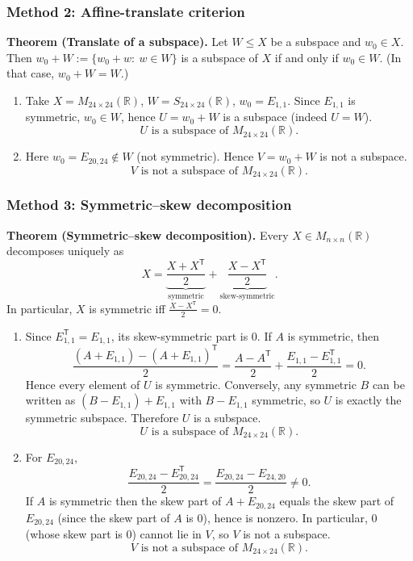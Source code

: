 \documentclass[12pt]{article}
\let\amsboxed\boxed
\renewcommand{\boxed}[1]{\amsboxed{\,#1\,}}
\begin{document}
\subsubsection{Method 2: Affine-translate criterion}
\textbf{Theorem (Translate of a subspace).}
Let $W\le X$ be a subspace and $w_0\in X$. Then $w_0+W:=\{w_0+w:\ w\in W\}$ is a subspace of $X$ if and only if $w_0\in W$.
(In that case, $w_0+W=W$.)

\begin{enumerate}[label=(\alph*)]
\item Take $X=M_{24\times 24}(\mathbb{R})$, $W=S_{24\times 24}(\mathbb{R})$, $w_0=E_{1,1}$.
Since $E_{1,1}$ is symmetric, $w_0\in W$, hence $U=w_0+W$ is a subspace (indeed $U=W$).
\[
\boxed{\,U\text{ is a subspace of }M_{24\times 24}(\mathbb{R}).\,}
\]

\item Here $w_0=E_{20,24}\notin W$ (not symmetric). Hence $V=w_0+W$ is not a subspace.
\[
\boxed{\,V\text{ is not a subspace of }M_{24\times 24}(\mathbb{R}).\,}
\]
\end{enumerate}
\newpage
\subsubsection{Method 3: Symmetric--skew decomposition}
\textbf{Theorem (Symmetric--skew decomposition).}
Every $X\in M_{n\times n}(\mathbb{R})$ decomposes uniquely as
\[
X=\underbrace{\frac{X+X^{\mathsf T}}{2}}_{\text{symmetric}}+\underbrace{\frac{X-X^{\mathsf T}}{2}}_{\text{skew-symmetric}}.
\]
In particular, $X$ is symmetric iff $\frac{X-X^{\mathsf T}}{2}=0$.

\begin{enumerate}[label=(\alph*)]
\item Since $E_{1,1}^{\mathsf T}=E_{1,1}$, its skew-symmetric part is $0$. If $A$ is symmetric, then
\[
\frac{(A+E_{1,1})-(A+E_{1,1})^{\mathsf T}}{2}
=\frac{A-A^{\mathsf T}}{2}+\frac{E_{1,1}-E_{1,1}^{\mathsf T}}{2}=0.
\]
Hence every element of $U$ is symmetric. Conversely, any symmetric $B$ can be written as $(B-E_{1,1})+E_{1,1}$ with $B-E_{1,1}$ symmetric, so $U$ is exactly the symmetric subspace. Therefore $U$ is a subspace.
\[
\boxed{\,U\text{ is a subspace of }M_{24\times 24}(\mathbb{R}).\,}
\]

\item For $E_{20,24}$,
\[
\frac{E_{20,24}-E_{20,24}^{\mathsf T}}{2}=\frac{E_{20,24}-E_{24,20}}{2}\neq 0.
\]
If $A$ is symmetric then the skew part of $A+E_{20,24}$ equals the skew part of $E_{20,24}$ (since the skew part of $A$ is $0$), hence is nonzero. In particular, $0$ (whose skew part is $0$) cannot lie in $V$, so $V$ is not a subspace.
\[
\boxed{\,V\text{ is not a subspace of }M_{24\times 24}(\mathbb{R}).\,}
\]
\end{enumerate}
\bigskip
\end{document}
